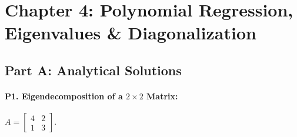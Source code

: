 \section*{Chapter 4: Polynomial Regression, Eigenvalues \& Diagonalization}

\subsection*{Part A: Analytical Solutions}

\paragraph{P1. Eigendecomposition of a $2 \times 2$ Matrix:}
$A = \begin{bmatrix} 4 & 2 \\ 1 & 3 \end{bmatrix}$.
